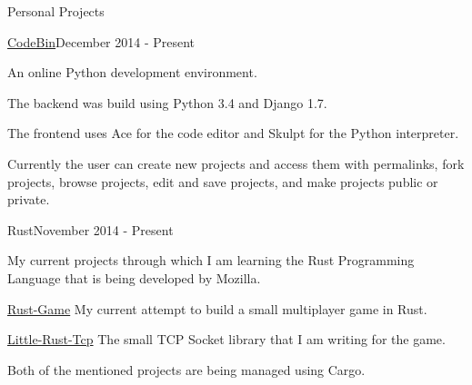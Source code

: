 \documentclass{resume} %
\begin{document}
\begin{rSection}{Personal Projects}

\begin{rSubsection}{\href{https://github.com/DylanTheVillain/CodeBin}{CodeBin}}{December 2014 - Present}{}{}

	\item An online Python development environment.
	\item The backend was build using Python 3.4 and Django 1.7.
	\item The frontend uses Ace for the code editor and Skulpt for the Python interpreter.
	\item Currently the user can create new projects and access them with permalinks, fork projects, browse projects, edit and save projects, and make projects public or private.
\end{rSubsection}

\begin{rSubsection}{Rust}{November 2014 - Present}{}{}
	\item My current projects through which I am learning the Rust Programming Language that is being developed by Mozilla.
	\item {\href{https://github.com/DylanTheVillain/Rust-Game}{Rust-Game}} My current attempt to build a small multiplayer game in Rust.
	\item {\href{https://github.com/DylanTheVillain/Little-Rust-Tcp}{Little-Rust-Tcp}} The small TCP Socket library that I am writing for the game.
	\item Both of the mentioned projects are being managed using Cargo.
\end{rSubsection}

\end{rSection}

\end{document}
